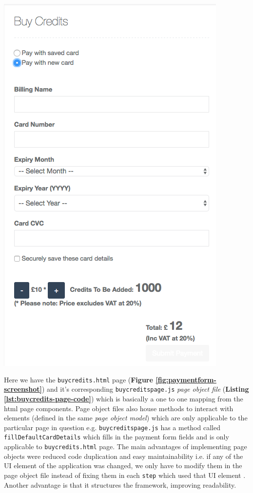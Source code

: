 \begin{minipage}{.49\textwidth}
  \includegraphics[width=\textwidth]{screenshot-payment-form.png}
 	\label{fig:paymentform-screenshot}
\end{minipage}

Here we have the \texttt{buycredits.html} page (\textbf{Figure \ref{fig:paymentform-screenshot}}) and it's corresponding \texttt{buycreditspage.js} \textit{page object file} (\textbf{Listing \ref{lst:buycredits-page-code}}) which is basically a one to one mapping from the html page components. Page object files also house methods to interact with elements (defined in the same \textit{page object model}) which are only applicable to the particular page in question e.g. \texttt{buycreditspage.js} has a method called \texttt{fillDefaultCardDetails} which fills in the payment form fields and is only applicable to \texttt{buycredits.html} page. The main advantages of implementing page objects were reduced code duplication and easy maintainability i.e.  if any of the UI element of the application was changed, we only have to modify them in the page object file instead of fixing them in each \texttt{step} which used that UI element \cite{semaphore}. Another advantage is that it structures the framework, improving readability.

